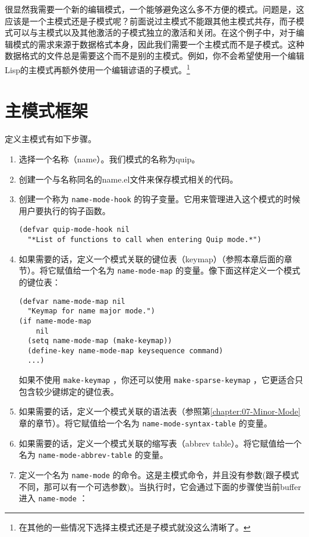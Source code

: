 很显然我需要一个新的编辑模式，一个能够避免这么多不方便的模式。问题是，这应该是一个主模式还是子模式呢？前面说过主模式不能跟其他主模式共存，而子模式可以与主模式以及其他激活的子模式独立的激活和关闭。在这个例子中，对于编辑模式的需求来源于数据格式本身，因此我们需要一个主模式而不是子模式。这种数据格式的文件总是需要这个而不是别的主模式。例如，你不会希望使用一个编辑Lisp的主模式再额外使用一个编辑谚语的子模式。\footnote{在其他的一些情况下选择主模式还是子模式就没这么清晰了。}

\section{主模式框架}
\label{section:09-Major-Mode-Skeleton}

定义主模式有如下步骤。

\begin{enumerate}
  \item 选择一个名称（name）。我们模式的名称为quip。
  \item 创建一个与名称同名的name.el文件来保存模式相关的代码。
  \item 创建一个称为 \texttt{name-mode-hook} 的钩子变量。它用来管理进入这个模式的时候用户要执行的钩子函数。
\begin{verbatim}
(defvar quip-mode-hook nil
  "*List of functions to call when entering Quip mode.*")
\end{verbatim}
  \item 如果需要的话，定义一个模式关联的键位表（keymap）（参照本章后面的章节）。将它赋值给一个名为 \texttt{name-mode-map} 的变量。像下面这样定义一个模式的键位表：
\begin{verbatim}
(defvar name-mode-map nil
  "Keymap for name major mode.")
(if name-mode-map
    nil
  (setq name-mode-map (make-keymap))
  (define-key name-mode-map keysequence command)
  ...)
\end{verbatim}
   如果不使用 \texttt{make-keymap} ，你还可以使用 \texttt{make-sparse-keymap} ，它更适合只包含较少键绑定的键位表。
  \item 如果需要的话，定义一个模式关联的语法表（参照第\ref{chapter:07-Minor-Mode}章的章节）。将它赋值给一个名为 \texttt{name-mode-syntax-table} 的变量。
  \item 如果需要的话，定义一个模式关联的缩写表（abbrev table）。将它赋值给一个名为 \texttt{name-mode-abbrev-table} 的变量。
  \item 定义一个名为 \texttt{name-mode} 的命令。这是主模式命令，并且没有参数(跟子模式不同，那可以有一个可选参数)。当执行时，它会通过下面的步骤使当前buffer进入 \texttt{name-mode} ：

\end{enumerate}
